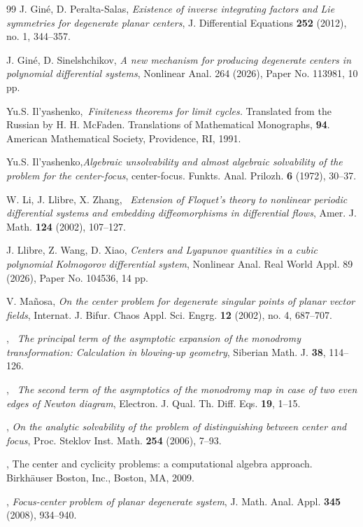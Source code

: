 \documentclass[12pt]{amsart}
\begin{document}
\begin{thebibliography}{99}
 {\sc J. Gin\'e, D. Peralta-Salas}, {\it Existence of inverse integrating factors and Lie symmetries for degenerate planar centers}, J. Differential Equations {\bf 252} (2012), no. 1, 344--357.

 {\sc J. Gin\'e, D. Sinelshchikov}, {\it A new mechanism for producing degenerate centers in polynomial differential systems}, Nonlinear Anal. 264 (2026), Paper No. 113981, 10 pp.

 {\sc Yu.S. Il'yashenko},{\it \ Finiteness theorems for limit cycles.} Translated from the Russian by H. H. McFaden. Translations of Mathematical Monographs, {\bf 94}. American Mathematical Society, Providence, RI, 1991.

 {\sc Yu.S. Il'yashenko},{\it Algebraic unsolvability and almost algebraic solvability of the problem for the center-focus},  center-focus. Funkts. Anal. Prilozh. {\bf 6} (1972), 30--37.

 {\sc W. Li, J. Llibre, X. Zhang}, {\it \ Extension of Floquet's theory to nonlinear periodic differential systems and embedding diffeomorphisms in differential flows},  Amer. J. Math.  {\bf 124}  (2002), 107--127.

 {\sc J. Llibre, Z. Wang, D. Xiao}, {\it Centers and Lyapunov quantities in a cubic polynomial Kolmogorov differential system}, Nonlinear Anal. Real World Appl. 89 (2026), Paper No. 104536, 14 pp.

 {\sc V. Ma\~{n}osa}, {\it On the center problem for degenerate singular points of planar vector fields},
Internat. J. Bifur. Chaos Appl. Sci. Engrg. {\bf 12} (2002), no. 4, 687--707.

, {\it \ The principal term of the asymptotic expansion of the monodromy
    transformation: Calculation in blowing-up geometry}, Siberian Math. J. {\bf 38}, 114--126.

, {\it \ The second term of the asymptotics of the monodromy
    map in case of two even edges of Newton diagram}, Electron. J. Qual. Th. Diff. Eqs. {\bf 19}, 1--15.

, {\it On the analytic solvability of the problem of distinguishing between
    center and focus}, Proc. Steklov Inst. Math. {\bf 254} (2006), 7--93.

, The center and cyclicity problems: a computational
    algebra approach. Birkh\"auser Boston, Inc., Boston, MA, 2009.

 , {\it Focus-center problem of planar degenerate system}, J. Math. Anal. Appl. {\bf 345} (2008), 934--940.

\end{thebibliography}
\end{document}
